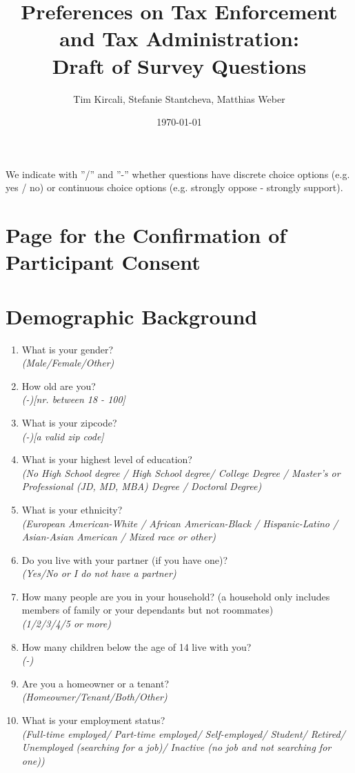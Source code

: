 \documentclass[11pt]{article}
\title{Preferences on Tax Enforcement and Tax Administration:\\Draft of Survey Questions}
\author{Tim Kircali, Stefanie Stantcheva, Matthias Weber}
\date{\today} %
\begin{document}
\maketitle

\noindent We indicate with ”/” and ”-” whether questions have discrete choice options (e.g. yes / no) or continuous choice options (e.g. strongly oppose - strongly support). 
\section*{Page for the Confirmation of Participant Consent}
\section*{Demographic Background}
\begin{enumerate}
    \item What is your gender? \\ \textit{(Male/Female/Other)} 
    \item How old are you? \\ \textit{(-)[nr. between 18 - 100]}
    \item What is your zipcode? \\ \textit{(-)[a valid zip code]}
    \item What is your highest level of education? \\ \textit{(No High School degree / High School degree/ College Degree / Master’s or Professional (JD, MD, MBA) Degree / Doctoral Degree)}
    \item What is your ethnicity? \\ \textit{(European American-White / African American-Black / Hispanic-Latino / Asian-Asian American / Mixed race or other)}
    \item Do you live with your partner (if you have one)? \\ \textit{(Yes/No or I do not have a partner)}
    \item How many people are you in your household? (a household only includes members of family or your dependants but not roommates) \\ \textit{(1/2/3/4/5 or more)}
    \item How many children below the age of 14 live with you? \\ \textit{(-)}
    \item Are you a homeowner or a tenant? \\ \textit{(Homeowner/Tenant/Both/Other)}
    \item What is your employment status? \\ \textit{(Full-time employed/ Part-time employed/ Self-employed/ Student/ Retired/ Unemployed (searching for a job)/ Inactive (no job and not searching for one))}

\end{enumerate}
\end{document}
